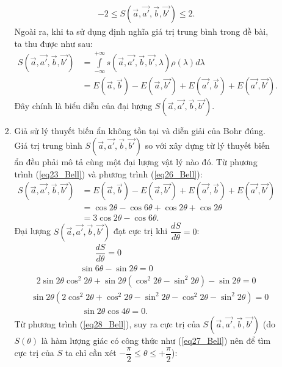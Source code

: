 \begin{enumerate}
\begin{enumerate}[label=\textbf{\alph*,}]
\begin{enumerate}
\begin{align} \label{eq25_Bell}
    -2\leq S(\Vec{a},\Vec{a'},\Vec{b},\Vec{b'}) \leq 2.
\end{align}
Ngoài ra, khi ta sử dụng định nghĩa giá trị trung bình trong đề bài, ta thu được như sau:
\begin{align}
    S(\Vec{a},\Vec{a'},\Vec{b},\Vec{b'})&=\displaystyle\int\limits_{-\infty}^{+\infty}s(\Vec{a},\Vec{a'},\Vec{b},\Vec{b'},\lambda)\rho(\lambda)d\lambda \nonumber \\
    \label{eq26_Bell}
    &=E(\Vec{a},\Vec{b})-E(\Vec{a},\Vec{b'})+E(\Vec{a'},\Vec{b})+E(\Vec{a'},\Vec{b'}).
\end{align}
Đây chính là biểu diễn của đại lượng $S(\Vec{a},\Vec{a'},\Vec{b},\Vec{b'})$.
\item Giả sử lý thuyết biến ẩn không tồn tại và diễn giải của Bohr đúng. Giá trị trung bình $S(\Vec{a},\Vec{a'},\Vec{b},\Vec{b'})$ so với xây dựng từ lý thuyết biến ẩn đều phải mô tả cùng một đại lượng vật lý nào đó. Từ phương trình (\ref{eq23_Bell}) và phương trình (\ref{eq26_Bell}):
\begin{align}
    S(\Vec{a},\Vec{a'},\Vec{b},\Vec{b'})&=E(\Vec{a},\Vec{b})-E(\Vec{a},\Vec{b'})+E(\Vec{a'},\Vec{b})+E(\Vec{a'},\Vec{b'}) \nonumber \\
    &= \cos 2\theta - \cos 6\theta + \cos 2\theta + \cos 2\theta \nonumber \\
    \label{eq27_Bell}
    &= 3\cos 2\theta - \cos 6\theta.
\end{align}
Đại lượng $S(\Vec{a},\Vec{a'},\Vec{b},\Vec{b'})$ đạt cực trị khi $\dfrac{dS}{d\theta}=0$:
\begin{align}
    &\ \ \ \ \ \ \ \ \ \ \ \ \ \ \ \ \ \ \ \ \ \ \ \ \ \ \ \ \ \ \ \ \ \    \dfrac{dS}{d\theta}=0 \nonumber \\
    &\ \ \ \ \ \ \ \ \ \ \ \ \ \ \ \ \ \ \ \ \ \ \ \ \ \ \sin 6\theta - \sin 2\theta =0 \nonumber \\
    &\ \ \  2\sin 2\theta \cos^2 2\theta + \sin 2\theta \left(\cos^2 2\theta - \sin^2 2\theta\right)-\sin 2\theta = 0\nonumber \\
    &\sin 2\theta \left(2 \cos^2 2\theta + \cos^2 2\theta - \sin^2 2\theta -\cos^2 2\theta-\sin^2 2\theta\right)=0\nonumber \\
    \label{eq28_Bell}
    &\ \ \ \ \ \ \ \ \ \ \ \ \ \ \ \ \ \ \ \ \ \ \ \ \ \ \  \sin 2\theta \cos 4\theta =0.
\end{align}
Từ phương trình (\ref{eq28_Bell}), suy ra cực trị của $S(\Vec{a},\Vec{a'},\Vec{b},\Vec{b'})$ \Big(do $S(\theta)$ là hàm lượng giác có công thức như (\ref{eq27_Bell}) nên để tìm cực trị của $S$ ta chỉ cần xét $-\dfrac{\pi}{2}\leq \theta \leq +\dfrac{\pi}{2}$\Big):

\end{enumerate}
\end{enumerate}
\end{enumerate}
